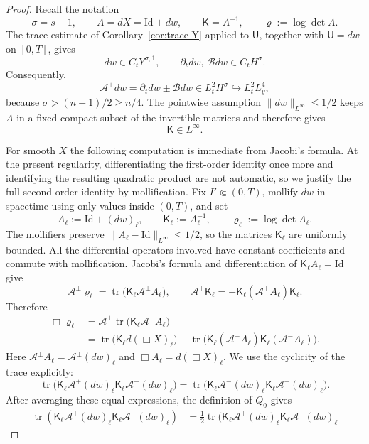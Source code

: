 \documentclass[11pt,reqno]{amsart}
\theoremstyle{plain}
\theoremstyle{definition}
\theoremstyle{remark}
\numberwithin{equation}{section}
\DeclareMathOperator{\tr}{tr}
\newcommand{\Ufield}{\mathsf U}
\newcommand{\Kmat}{\mathsf K}
\begin{document}
\begin{proof}
Recall the notation
\[
 \sigma=s-1
 ,
 \qquad
 A=dX=\mathrm{Id}+dw,
 \qquad
 \Kmat=A^{-1},
 \qquad
 \varrho:=\log\det A.
\]
The trace estimate of Corollary~\ref{cor:trace-Y} applied to $\Ufield$, together with
$\Ufield=dw$ on $[0,T]$, gives
\[
 dw\in C_tY^{\sigma,1},
 \qquad
 \partial_tdw,\ \mathcal Bdw\in C_tH^\sigma.
\]
Consequently,
\[
 \mathcal A^\pm dw
 =\partial_tdw\pm\mathcal Bdw
 \in L^2_tH^\sigma
 \hookrightarrow L^2_tL^4_y,
\]
because $\sigma>(n-1)/2\ge n/4$.  The pointwise assumption
$\|dw\|_{L^\infty}\le 1/2$ keeps $A$ in a fixed compact subset of
the invertible matrices and therefore gives
\[
 \Kmat\in L^\infty.
\]

For smooth $X$ the following computation is immediate from Jacobi's formula.
At the present regularity, differentiating the first-order identity once more
and identifying the resulting quadratic product are not automatic, so we
justify the full second-order identity by mollification. Fix
$I'\Subset(0,T)$, mollify $dw$ in spacetime using only values inside
$(0,T)$, and set
\[
 A_\ell:=\mathrm{Id}+(dw)_\ell,
 \qquad
 \Kmat_\ell:=A_\ell^{-1},
 \qquad
 \varrho_\ell:=\log\det A_\ell.
\]
The mollifiers preserve
$\|A_\ell-\mathrm{Id}\|_{L^\infty}\le1/2$, so the matrices
$\Kmat_\ell$ are uniformly bounded. All the differential operators involved
have constant coefficients and commute with mollification. Jacobi's formula
and differentiation of $\Kmat_\ell A_\ell=\mathrm{Id}$ give
\[
 \mathcal A^\pm\varrho_\ell
 =\tr\bigl(\Kmat_\ell\mathcal A^\pm A_\ell\bigr),
 \qquad
 \mathcal A^+\Kmat_\ell
 =-\Kmat_\ell(\mathcal A^+A_\ell)\Kmat_\ell.
\]
Therefore
\begin{align*}
 \Box\varrho_\ell
 &=\mathcal A^+\tr\bigl(\Kmat_\ell\mathcal A^-A_\ell\bigr)\\
 &=\tr\bigl(\Kmat_\ell d(\Box X)_\ell\bigr)
   -\tr\bigl(
       \Kmat_\ell(\mathcal A^+A_\ell)
       \Kmat_\ell(\mathcal A^-A_\ell)
     \bigr).
\end{align*}
Here $\mathcal A^\pm A_\ell=\mathcal A^\pm(dw)_\ell$ and
$\Box A_\ell=d(\Box X)_\ell$. We use the cyclicity of the trace explicitly:
\[
 \tr\bigl(
   \Kmat_\ell\mathcal A^+(dw)_\ell
   \Kmat_\ell\mathcal A^-(dw)_\ell
 \bigr)
 =\tr\bigl(
   \Kmat_\ell\mathcal A^-(dw)_\ell
   \Kmat_\ell\mathcal A^+(dw)_\ell
 \bigr).
\]
After averaging these equal expressions, the definition of $Q_0$ gives
\begin{align*}
 \tr(\Kmat_\ell \mathcal A^+(dw)_\ell \Kmat_\ell \mathcal A^-(dw)_\ell)
 &=\frac12\tr\bigl(
      \Kmat_\ell \mathcal A^+(dw)_\ell \Kmat_\ell \mathcal A^-(dw)_\ell

\end{align*}
\end{proof}
\end{document}
